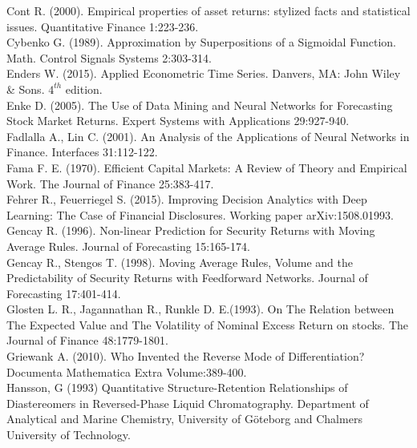 \documentclass[12pt, letterpaper]{amsart}%
\begin{document}
Cont R. (2000). Empirical properties of asset returns: stylized facts and statistical issues. Quantitative Finance 1:223-236.
\\

Cybenko G. (1989). Approximation by Superpositions of a Sigmoidal Function. Math. Control Signals Systems 2:303-314.
\\

Enders W. (2015). Applied Econometric Time Series. Danvers, MA: John Wiley \& Sons. $4^{th}$ edition.
\\

Enke D. (2005). The Use of Data Mining and Neural Networks for Forecasting Stock Market Returns. Expert Systems with Applications 29:927-940.
\\

Fadlalla A., Lin C. (2001). An Analysis of the Applications of Neural Networks in Finance. Interfaces 31:112-122.
\\

Fama F. E. (1970). Efficient Capital Markets: A Review of Theory and Empirical Work. The Journal of Finance 25:383-417.
\\

Fehrer R., Feuerriegel S. (2015). Improving Decision Analytics with Deep Learning: The
Case of Financial Disclosures. Working paper arXiv:1508.01993.
\\

Gencay R. (1996). Non-linear Prediction for Security Returns with Moving Average Rules. Journal of Forecasting 15:165-174.
\\

Gencay R., Stengos T. (1998). Moving Average Rules, Volume and the Predictability of Security Returns with Feedforward Networks. Journal of Forecasting 17:401-414.
\\

Glosten L. R., Jagannathan R., Runkle D. E.(1993). On The Relation between The Expected Value and The Volatility of Nominal Excess Return on stocks. The Journal of Finance 48:1779-1801.
\\

Griewank A. (2010). Who Invented the Reverse Mode of Differentiation? Documenta Mathematica Extra Volume:389-400.
\\

Hansson, G (1993) Quantitative Structure-Retention Relationships of Diastereomers in Reversed-Phase Liquid Chromatography. Department of Analytical and Marine Chemistry, University of Göteborg and Chalmers University of Technology.
\\
\end{document}
